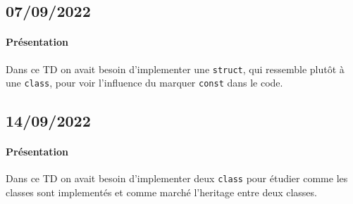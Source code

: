 \documentclass{article}
\begin{document}
\subsection{07/09/2022}
\paragraph{Présentation}Dans ce TD on avait besoin d'implementer une \texttt{struct}, qui ressemble plutôt à une \texttt{class}, pour voir l'influence du marquer \texttt{const} dans le code.
\begin{scriptsize}
    \mycode
    
\end{scriptsize}
\begin{scriptsize}
    \mycode
    
\end{scriptsize}

\newpage\subsection{14/09/2022}
\paragraph{Présentation}Dans ce TD on avait besoin d'implementer deux \texttt{class} pour étudier comme les classes sont implementés et comme marché l'heritage entre deux classes.
\begin{scriptsize}
    \mycode
    
\end{scriptsize}
\begin{scriptsize}
    \mycode
    
\end{scriptsize}
\begin{scriptsize}
    \mycode
    
\end{scriptsize}
\end{document}
